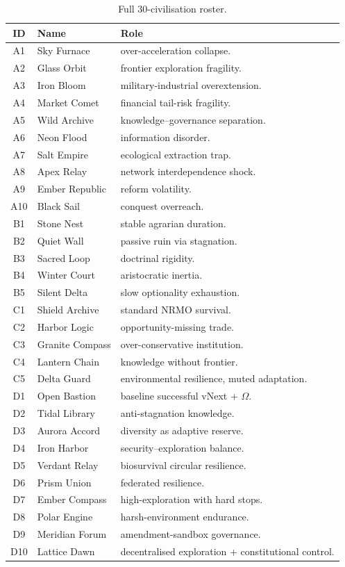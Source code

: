 \begin{table}[ht]
\centering
\small
\begin{tabularx}{\linewidth}{cXX}
\toprule
\textbf{ID} & \textbf{Name} & \textbf{Role} \\
\midrule
A1 & Sky Furnace & over-acceleration collapse. \\
A2 & Glass Orbit & frontier exploration fragility. \\
A3 & Iron Bloom & military-industrial overextension. \\
A4 & Market Comet & financial tail-risk fragility. \\
A5 & Wild Archive & knowledge--governance separation. \\
A6 & Neon Flood & information disorder. \\
A7 & Salt Empire & ecological extraction trap. \\
A8 & Apex Relay & network interdependence shock. \\
A9 & Ember Republic & reform volatility. \\
A10 & Black Sail & conquest overreach. \\
\midrule
B1 & Stone Nest & stable agrarian duration. \\
B2 & Quiet Wall & passive ruin via stagnation. \\
B3 & Sacred Loop & doctrinal rigidity. \\
B4 & Winter Court & aristocratic inertia. \\
B5 & Silent Delta & slow optionality exhaustion. \\
\midrule
C1 & Shield Archive & standard NRMO survival. \\
C2 & Harbor Logic & opportunity-missing trade. \\
C3 & Granite Compass & over-conservative institution. \\
C4 & Lantern Chain & knowledge without frontier. \\
C5 & Delta Guard & environmental resilience, muted adaptation. \\
\midrule
D1 & Open Bastion & baseline successful vNext + $\Omega$. \\
D2 & Tidal Library & anti-stagnation knowledge. \\
D3 & Aurora Accord & diversity as adaptive reserve. \\
D4 & Iron Harbor & security--exploration balance. \\
D5 & Verdant Relay & biosurvival circular resilience. \\
D6 & Prism Union & federated resilience. \\
D7 & Ember Compass & high-exploration with hard stops. \\
D8 & Polar Engine & harsh-environment endurance. \\
D9 & Meridian Forum & amendment-sandbox governance. \\
D10 & Lattice Dawn & decentralised exploration + constitutional
control. \\
\bottomrule
\end{tabularx}
\caption[30-civilisation roster]{Full 30-civilisation roster.}
\label{tab:omega-30-roster}
\end{table}

